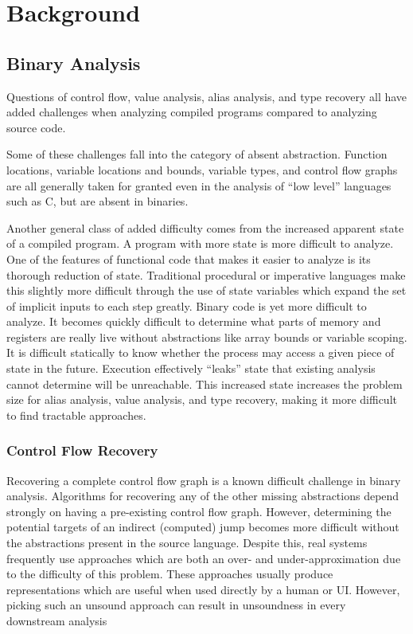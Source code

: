 \chapter{Background}
\label{chap:background}
\section{Binary Analysis}
Questions of control flow, value analysis, alias analysis, and type recovery all have added challenges when analyzing compiled programs compared to analyzing source code.

Some of these challenges fall into the category of absent abstraction.
Function locations, variable locations and bounds, variable types, and control flow graphs are all generally taken for granted even in the analysis of ``low level'' languages such as C, but are absent in binaries.

Another general class of added difficulty comes from the increased apparent state of a compiled program.
A program with more state is more difficult to analyze.
One of the features of functional code that makes it easier to analyze is its thorough reduction of state.
Traditional procedural or imperative languages make this slightly more difficult through the use of state variables which expand the set of implicit inputs to each step greatly.
Binary code is yet more difficult to analyze.
It becomes quickly difficult to determine what parts of memory and registers are really live without abstractions like array bounds or variable scoping.
It is difficult statically to know whether the process may access a given piece of state in the future.
Execution effectively ``leaks'' state that existing analysis cannot determine will be unreachable.
This increased state increases the problem size for alias analysis, value analysis, and type recovery, making it more difficult to find tractable approaches.

\subsection{Control Flow Recovery}
\label{sec:cfg}
Recovering a complete control flow graph is a known difficult challenge in binary analysis.
Algorithms for recovering any of the other missing abstractions depend strongly on having a pre-existing control flow graph\cite{vsa,bddbddb,smash,tie,bitr,wrappedintervals,ramalingam2000}.
However, determining the potential targets of an indirect (computed) jump becomes more difficult without the abstractions present in the source language.
Despite this, real systems frequently use approaches which are both an over- and under-approximation due to the difficulty of this problem.
These approaches usually produce representations which are useful when used directly by a human or UI.
However, picking such an unsound approach can result in unsoundness in every downstream analysis

